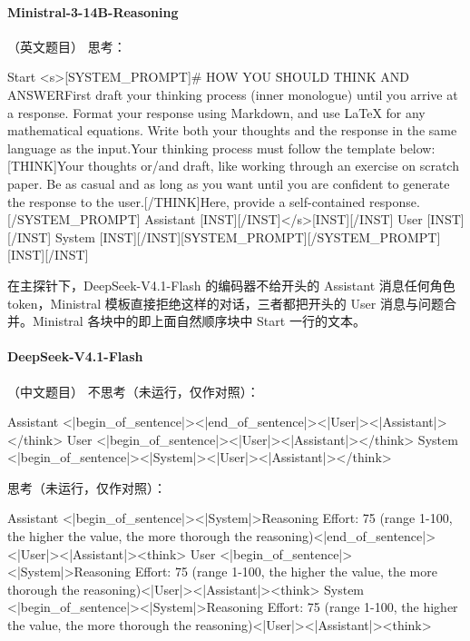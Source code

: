 \paragraph{Ministral-3-14B-Reasoning} （英文题目）
\noindent 思考：
\begin{Rendering}
Start      <s>[SYSTEM_PROMPT]# HOW YOU SHOULD THINK AND ANSWER\NL{}\NL{}First draft your thinking process (inner monologue) until you arrive at a response. Format your response using Markdown, and use LaTeX for any mathematical equations. Write both your thoughts and the response in the same language as the input.\NL{}\NL{}Your thinking process must follow the template below:[THINK]Your thoughts or/and draft, like working through an exercise on scratch paper. Be as casual and as long as you want until you are confident to generate the response to the user.[/THINK]Here, provide a self-contained response.[/SYSTEM_PROMPT]
Assistant  [INST][/INST]</s>[INST][/INST]
User       [INST]\NL{}\NL{}\NL{}\NL{}[/INST]
System     [INST][/INST][SYSTEM_PROMPT][/SYSTEM_PROMPT][INST][/INST]
\end{Rendering}

在主探针下，DeepSeek-V4.1-Flash 的编码器不给开头的 Assistant 消息任何角色 token，Ministral 模板直接拒绝这样的对话，三者都把开头的 User 消息与问题合并。Ministral 各块中的即上面自然顺序块中 Start 一行的文本。

\paragraph{DeepSeek-V4.1-Flash} （中文题目）
\noindent 不思考（未运行，仅作对照）：
\begin{Rendering}
Assistant  <|begin_of_sentence|><|end_of_sentence|><|User|><|Assistant|></think>
User       <|begin_of_sentence|><|User|>\NL{}\NL{}<|Assistant|></think>
System     <|begin_of_sentence|><|System|><|User|><|Assistant|></think>
\end{Rendering}
\noindent 思考（未运行，仅作对照）：
\begin{Rendering}
Assistant  <|begin_of_sentence|><|System|>Reasoning Effort: 75 (range 1-100, the higher the value, the more thorough the reasoning)\NL{}\NL{}<|end_of_sentence|><|User|><|Assistant|><think>
User       <|begin_of_sentence|><|System|>Reasoning Effort: 75 (range 1-100, the higher the value, the more thorough the reasoning)\NL{}\NL{}<|User|>\NL{}\NL{}<|Assistant|><think>
System     <|begin_of_sentence|><|System|>Reasoning Effort: 75 (range 1-100, the higher the value, the more thorough the reasoning)\NL{}\NL{}<|User|><|Assistant|><think>
\end{Rendering}
